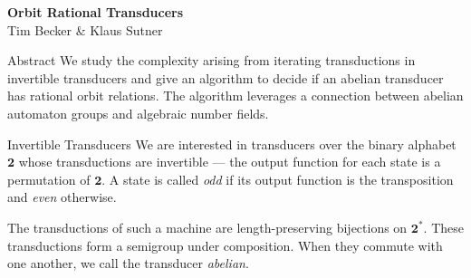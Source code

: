 \documentclass[a0]{a0poster}
\newcommand{\bin}{\pmb{\bm{2}}}
\begin{document}
\begin{poster-header}
    \begin{center}
        \color{white}
        \veryHuge
        {\bf{Orbit Rational Transducers}}\\
        \huge {Tim Becker \& Klaus Sutner}
    \end{center}
\end{poster-header}

\columnsep=50pt
\begin{multicols}{2}

\begin{poster-section}{Abstract}
    \Large
    We study the complexity arising from iterating transductions in invertible
    transducers and give an algorithm to decide if an abelian transducer has
    rational orbit relations. The algorithm leverages a connection between
    abelian automaton groups and algebraic number fields.
\end{poster-section}

\begin{poster-section}{Invertible Transducers}
\Large
We are interested in transducers over the binary alphabet $\bin$ whose
transductions are invertible --- the output function for each state is a
permutation of $\bin$. A state is called \emph{odd} if its output function is
the transposition and \emph{even} otherwise.
\begin{center}
\end{center}
The transductions of such a machine are length-preserving bijections on
$\bin^*$. These transductions form a semigroup under composition.
When they commute with one another, we call the transducer \emph{abelian}.\\


\end{poster-section}
\end{multicols}
\end{document}

